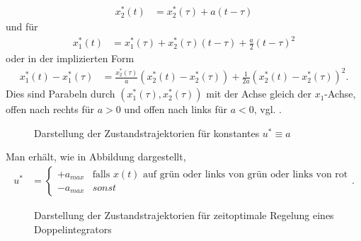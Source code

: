 \begin{exmp}
\begin{align*}
	x_2^{\ast}(t)&=x_2^{\ast}(\tau)+a(t-\tau)
\end{align*} und für
\begin{align*}
	x_1^{\ast}(t)&=x_1^{\ast}(\tau)+x_2^{\ast}(\tau)(t-\tau)+\frac{a}{2}(t-\tau)^2
\end{align*} 
oder in der implizierten Form 
\begin{align*}
	x_1^{\ast}(t)-x_1^{\ast}(\tau) & = \frac{x_2^{\ast}(\tau)}{a}\left(x_2^{\ast}(t)-x_2^{\ast}(\tau) \right) +
	\frac{1}{2a}\left(x_2^{\ast}(t)-x_2^{\ast}(\tau) \right)^2.
\end{align*}
Dies sind Parabeln durch $(x_1^{\ast}(\tau),x_2^{\ast}(\tau))$ mit der Achse gleich der $x_1$-Achse, offen nach rechts für $a>0$ und offen nach links
für $a<0$, vgl. .
\begin{figure}[htb]
	\centering
	
	\caption{Darstellung der Zustandstrajektorien für konstantes $u^{\ast}\equiv a$}
	\label{fig:kap_2_bsp_1_zustands_pont}
\end{figure}
Man erhält, wie in Abbildung  dargestellt,
\begin{align*}
	u^{\ast} & = \left\{\begin{array}{cl}
	+a_{max} & \text{falls $x(t)$ auf grün oder links von grün oder links von rot}\\
	-a_{max} & sonst
	\end{array} \right. .
\end{align*}
\begin{figure}[htb]
	\centering
	
	\caption{Darstellung der Zustandstrajektorien für zeitoptimale Regelung eines Doppelintegrators}
	\label{fig:kap_2_bsp_1_zustands_u_pont}
\end{figure}
\end{exmp}
